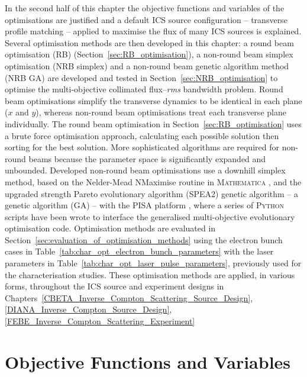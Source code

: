 \documentclass[../main.tex]{subfiles}
\begin{document}
In the second half of this chapter the objective functions and variables of the optimisations are justified and a default ICS source configuration -- transverse profile matching -- applied to maximise the flux of many ICS sources is explained. Several optimisation methods are then developed in this chapter: a round beam optimisation (RB) (Section~\ref{sec:RB_optimisation}), a non-round beam simplex optimisation (NRB simplex) and a non-round beam genetic algorithm method (NRB GA) are developed and tested in Section~\ref{sec:NRB_optimisation} to optimise the multi-objective collimated flux--\textit{rms} bandwidth problem. Round beam optimisations simplify the transverse dynamics to be identical in each plane ($x$ and $y$), whereas non-round beam optimisations treat each transverse plane individually. The round beam optimisation in Section~\ref{sec:RB_optimisation} uses a brute force optimisation approach, calculating each possible solution then sorting for the best solution. More sophisticated algorithms are required for non-round beams because the parameter space is significantly expanded and unbounded. Developed non-round beam optimisations use a downhill simplex method, based on the Nelder-Mead NMaximise routine in \textsc{Mathematica} \cite{wolfram2021nmaximize}, and the upgraded strength Pareto evolutionary algorithm (\textsc{SPEA2}) genetic algorithm \cite{zitzler2001spea2} -- a genetic algorithm (GA) -- with the \textsc{PISA} platform \cite{bleuler2003pisa}, where a series of \textsc{Python} scripts have been wrote to interface the generalised multi-objective evolutionary optimisation code. Optimisation methods are evaluated in Section~\ref{sec:evaluation_of_optimisation_methods} using the electron bunch cases in Table~\ref{tab:char_opt_electron_bunch_parameters} with the laser parameters in Table~\ref{tab:char_opt_laser_pulse_parameters}, previously used for the characterisation studies. These optimisation methods are applied, in various forms, throughout the ICS source and experiment designs in Chapters~\ref{CBETA_Inverse_Compton_Scattering_Source_Design}, \ref{DIANA_Inverse_Compton_Source_Design}, \ref{FEBE_Inverse_Compton_Scattering_Experiment}    

\section{Objective Functions and Variables}
\label{sec:objective_functions_and_variables}
\end{document}
